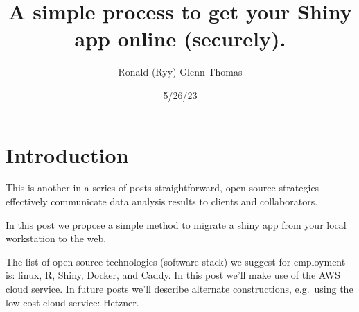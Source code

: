 \documentclass[
  letterpaper,
  DIV=11,
  numbers=noendperiod,
  oneside]{scrartcl}
\title{A simple process to get your Shiny app online (securely).}
\author{Ronald (Ryy) Glenn Thomas}
\date{5/26/23}
\renewcommand*\contentsname{Table of contents}
\newcommand\contentsname{Table of contents}
\begin{document}
\maketitle
\ifdefined\Shaded\renewenvironment{Shaded}{\begin{tcolorbox}[enhanced, interior hidden, borderline west={3pt}{0pt}{shadecolor}, sharp corners, breakable, frame hidden, boxrule=0pt]}{\end{tcolorbox}}\fi

\renewcommand*\contentsname{Table of contents}
{
\hypersetup{linkcolor=}
\setcounter{tocdepth}{3}
\tableofcontents
}

\hypertarget{introduction}{%
\section{Introduction}\label{introduction}}

This is another in a series of posts straightforward, open-source
strategies effectively communicate data analysis results to clients and
collaborators.

In this post we propose a simple method to migrate a shiny app from your
local workstation to the web.

The list of open-source technologies (software stack) we suggest for
employment is: linux, R, Shiny, Docker, and Caddy. In this post we'll
make use of the AWS cloud service. In future posts we'll describe
alternate constructions, e.g.~using the low cost cloud service: Hetzner.
\end{document}
